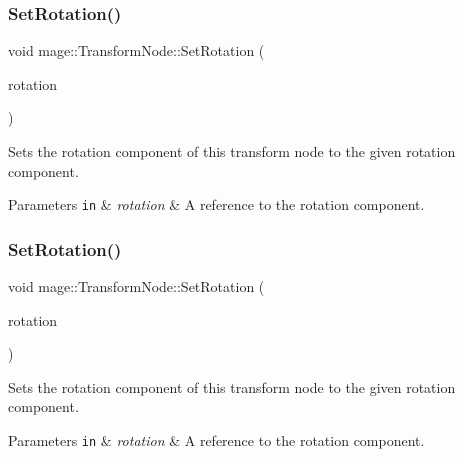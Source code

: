 \subsubsection{\texorpdfstring{Set\+Rotation()}{SetRotation()}\hspace{0.1cm}{\footnotesize\ttfamily [2/4]}}
{\footnotesize\ttfamily void mage\+::\+Transform\+Node\+::\+Set\+Rotation (\begin{DoxyParamCaption}\item[{const X\+M\+F\+L\+O\+A\+T3 \&}]{rotation }\end{DoxyParamCaption})\hspace{0.3cm}{\ttfamily [noexcept]}}

Sets the rotation component of this transform node to the given rotation component.


\begin{DoxyParams}[1]{Parameters}
\mbox{\tt in}  & {\em rotation} & A reference to the rotation component. \\
\hline
\end{DoxyParams}
\hypertarget{structmage_1_1_transform_node_aceda2ef578b04428dd7a271943daa8c8}{}\label{structmage_1_1_transform_node_aceda2ef578b04428dd7a271943daa8c8} 
\subsubsection{\texorpdfstring{Set\+Rotation()}{SetRotation()}\hspace{0.1cm}{\footnotesize\ttfamily [3/4]}}
{\footnotesize\ttfamily void mage\+::\+Transform\+Node\+::\+Set\+Rotation (\begin{DoxyParamCaption}\item[{X\+M\+F\+L\+O\+A\+T3 \&\&}]{rotation }\end{DoxyParamCaption})\hspace{0.3cm}{\ttfamily [noexcept]}}

Sets the rotation component of this transform node to the given rotation component.


\begin{DoxyParams}[1]{Parameters}
\mbox{\tt in}  & {\em rotation} & A reference to the rotation component. \\
\hline
\end{DoxyParams}
\hypertarget{structmage_1_1_transform_node_a354d20ffedec33173a598718677f7a74}{}\label{structmage_1_1_transform_node_a354d20ffedec33173a598718677f7a74} 
